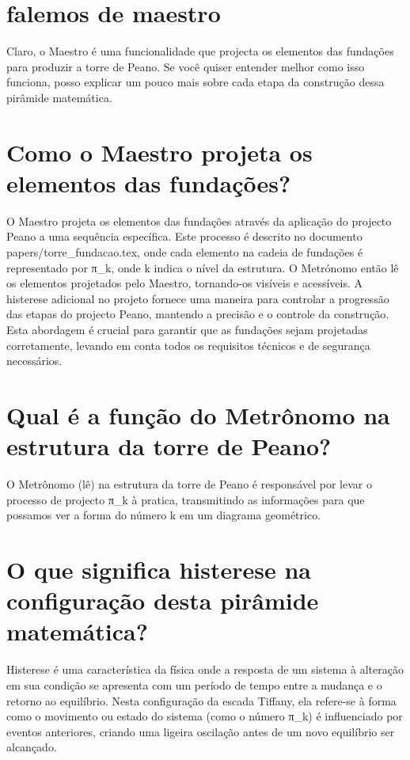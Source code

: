 \documentclass[11pt,a4paper]{article}
\begin{document}
\section{falemos de maestro}
Claro, o Maestro é uma funcionalidade que projecta os elementos das fundações para produzir a torre de Peano. Se você quiser entender melhor como isso funciona, posso explicar um pouco mais sobre cada etapa da construção dessa pirâmide matemática.

\section{Como o Maestro projeta os elementos das fundações?}
O Maestro projeta os elementos das fundações através da aplicação do projecto Peano a uma sequência específica. Este processo é descrito no documento papers/torre\_fundacao.tex, onde cada elemento na cadeia de fundações é representado por π\_k, onde k indica o nível da estrutura. O Metrónomo então lê os elementos projetados pelo Maestro, tornando-os visíveis e acessíveis. A histerese adicional no projeto fornece uma maneira para controlar a progressão das etapas do projecto Peano, mantendo a precisão e o controle da construção. Esta abordagem é crucial para garantir que as fundações sejam projetadas corretamente, levando em conta todos os requisitos técnicos e de segurança necessários.

\section{Qual é a função do Metrônomo na estrutura da torre de Peano?}
O Metrônomo (lê) na estrutura da torre de Peano é responsável por levar o processo de projecto π\_k à pratica, transmitindo as informações para que possamos ver a forma do número k em um diagrama geométrico.

\section{O que significa histerese na configuração desta pirâmide matemática?}
Histerese é uma característica da física onde a resposta de um sistema à alteração em sua condição se apresenta com um período de tempo entre a mudança e o retorno ao equilíbrio. Nesta configuração da escada Tiffany, ela refere-se à forma como o movimento ou estado do sistema (como o número π\_k) é influenciado por eventos anteriores, criando uma ligeira oscilação antes de um novo equilíbrio ser alcançado.
\end{document}
